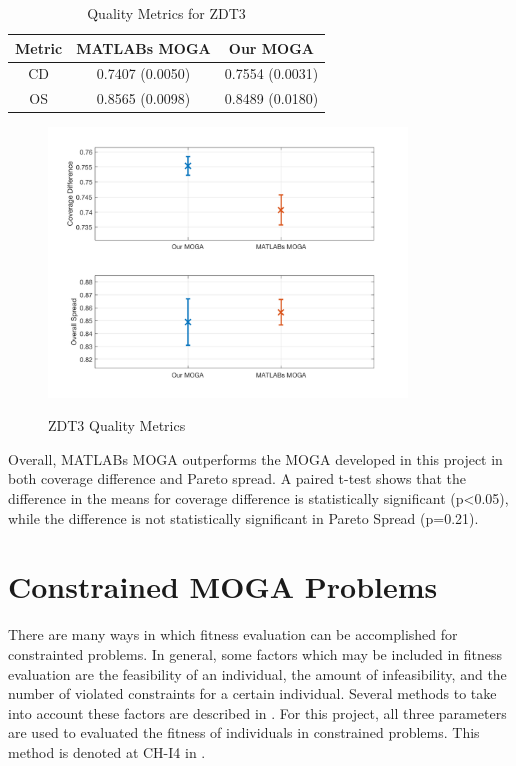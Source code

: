 \documentclass{article}
\begin{document}
\begin{table}[H]
\caption{Quality Metrics for ZDT3} 
\centering 
\begin{tabular}{|c|c|c|} 
\hline\hline  
Metric & MATLABs MOGA & Our MOGA \\ \hline
CD & 0.7407 (0.0050) & 0.7554 (0.0031) \\ \hline
OS & 0.8565 (0.0098) & 0.8489 (0.0180) \\ \hline
\end{tabular}
\label{tab:ZDT3} 
\end{table}
\begin{figure}[h]
  \caption{ZDT3 Quality Metrics}
  \centering
  \includegraphics[width=0.85\textwidth]{ZDT3_QM.png}  
  \label{fig:ZDT3_QM}
\end{figure}

\noindent Overall, MATLABs MOGA outperforms the MOGA developed in this project in both coverage difference and Pareto spread. A paired t-test shows that the difference in the means for coverage difference is statistically significant (p<0.05), while the difference is not statistically significant in Pareto Spread (p=0.21). \newline

\section{Constrained MOGA Problems}

There are many ways in which fitness evaluation can be accomplished for constrainted problems. In general, some factors which may be included in fitness evaluation are the feasibility of an individual, the amount of infeasibility, and the number of violated constraints for a certain individual. Several methods to take into account these factors are described in \cite{kurpati2002constraint}. For this project, all three parameters are used to evaluated the fitness of individuals in constrained problems. This method is denoted at CH-I4 in \cite{kurpati2002constraint}. \newline
\end{document}
